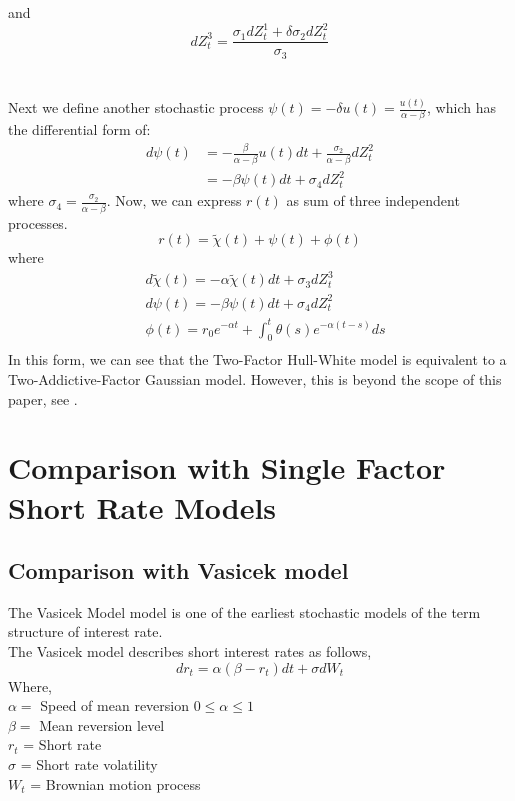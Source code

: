 \documentclass[11pt]{article}
\begin{document}
and 
\[
dZ_{t}^{3} = \frac{\sigma_{1}dZ_{t}^{1} + \delta\sigma_{2}dZ_{t}^{2}}{\sigma_{3}} 
\] \\
\\
Next we define another stochastic process $\psi(t) = -\delta u(t) = \frac{u(t)}{\alpha - \beta}$,
which has the differential form of:
\begin{align*}
d\psi(t) &= -\frac{\beta}{\alpha - \beta}u(t)dt + \frac{\sigma_{2}}{\alpha - \beta}dZ_{t}^{2} \\
&= -\beta\psi(t)dt + \sigma_{4}dZ_{t}^{2}
\end{align*}
where $\sigma_{4} = \frac{\sigma_{2}}{\alpha - \beta}$. Now, we can express $r(t)$ as sum of three independent processes.
\[
r(t) = \tilde{\chi}(t) + \psi(t) + \phi(t)  
\]
where
\begin{align*}
&d\tilde{\chi}(t) = -\alpha\tilde{\chi}(t)dt + \sigma_{3}dZ_{t}^{3} \\
&d\psi(t) = -\beta\psi(t)dt + \sigma_{4}dZ_{t}^{2} \\
&\phi(t) = r_{0}e^{-\alpha t} + \int_{0}^{t}{\theta(s)e^{-\alpha(t-s)}ds} \\
\end{align*}
In this form, we can see that the Two-Factor Hull-White model is equivalent to a Two-Addictive-Factor Gaussian model.
However, this is beyond the scope of this paper, see \cite{BA1}.
\section{Comparison with Single Factor Short Rate Models
}

\subsection{Comparison with Vasicek model
}
The Vasicek Model \cite{Vas1} model is one of the earliest stochastic models of the term structure of interest rate.\\

The Vasicek model describes short interest rates as follows,
 \[
dr_t = \alpha(\beta - r_t) dt + \sigma dW_t
\]
Where,\\
$\alpha =$ Speed of mean reversion $0 \leq \alpha \leq 1 $ \\
$\beta =$ Mean reversion level  \\
$r_t$ = Short rate  \\
$\sigma$ = Short rate volatility \\
$W_t$ = Brownian motion process  \\
\end{document}

